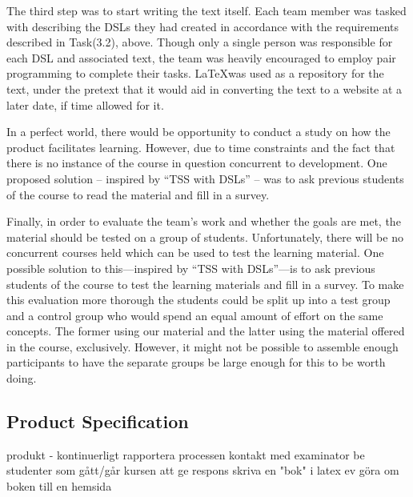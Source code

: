 The third step was to start writing the text itself. Each team member was tasked with describing the DSLs they had created in accordance with the requirements described in Task(3.2), above. Though only a single person was responsible for each DSL and associated text, the team was heavily encouraged to employ pair programming to complete their tasks. \LaTeX was used as a repository for the text, under the pretext that it would aid in converting the text to a website at a later date, if time allowed for it.




In a perfect world, there would be opportunity to conduct a study on how the product facilitates learning. However, due to time constraints and the fact that there is no instance of the course in question concurrent to development. One proposed solution -- inspired by ``TSS with DSLs'' -- was to ask previous students of the course to read the material and fill in a survey. 
    

Finally, in order to evaluate the team's work and whether the goals are met, the material should be tested on a group of students. Unfortunately, there will be no concurrent courses held which can be used to test the learning material. One possible solution to this---inspired by ``TSS with DSLs''---is to ask previous students of the course to test the learning materials and fill in a survey. 
To make this evaluation more thorough the students could be split up into a test group and a control group who would spend an equal amount of effort on the same concepts. The former using our material and the latter using the material offered in the course, exclusively. However, it might not be possible to assemble enough participants to have the separate groups be large enough for this to be worth doing. 
\fi


\subsection{Product Specification}

\iffalse
produkt - 
kontinuerligt rapportera processen
kontakt med examinator
be studenter som gått/går kursen att ge respons
skriva en "bok" i latex
ev göra om boken till en hemsida

